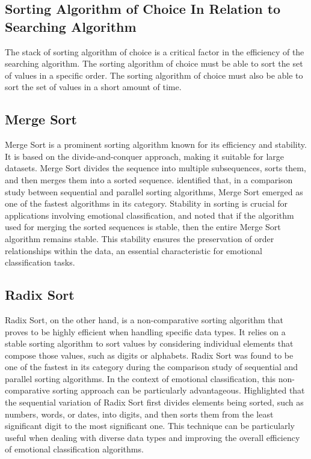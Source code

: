 \documentclass[11pt]{article}
\begin{document}
\begin{multicols*}{2}
    \subsection*{Sorting Algorithm of Choice In Relation to Searching Algorithm}
    \par The stack of sorting algorithm of choice is a critical factor in the efficiency of the searching algorithm. The sorting algorithm of choice must be able to sort the set of values in a specific order. The sorting algorithm of choice must also be able to sort the set of values in a short amount of time. \cite*{sorting_algorithm_comparison}
    \subsection*{Merge Sort}
    \par Merge Sort is a prominent sorting algorithm known for its efficiency and stability. It is based on the divide-and-conquer approach, making it suitable for large datasets. Merge Sort divides the sequence into multiple subsequences, sorts them, and then merges them into a sorted sequence. \cite*{sorting_algorithm_comparison} identified that, in a comparison study between sequential and parallel sorting algorithms, Merge Sort emerged as one of the fastest algorithms in its category. Stability in sorting is crucial for applications involving emotional classification, and noted that if the algorithm used for merging the sorted sequences is stable, then the entire Merge Sort algorithm remains stable. This stability ensures the preservation of order relationships within the data, an essential characteristic for emotional classification tasks.
    \subsection*{Radix Sort}
    \par Radix Sort, on the other hand, is a non-comparative sorting algorithm that proves to be highly efficient when handling specific data types. It relies on a stable sorting algorithm to sort values by considering individual elements that compose those values, such as digits or alphabets. Radix Sort was found to be one of the fastest in its category during the comparison study of sequential and parallel sorting algorithms. In the context of emotional classification, this non-comparative sorting approach can be particularly advantageous. Highlighted that the sequential variation of Radix Sort first divides elements being sorted, such as numbers, words, or dates, into digits, and then sorts them from the least significant digit to the most significant one. This technique can be particularly useful when dealing with diverse data types and improving the overall efficiency of emotional classification algorithms.

\end{multicols*}
\end{document}
